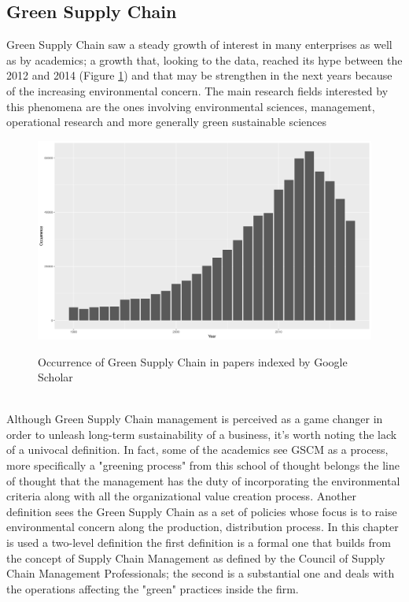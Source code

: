 \begin{doublespace}
\pagebreak

\section{Green Supply Chain}
Green Supply Chain saw a steady growth of interest in many enterprises\cite{Diabat2011} as well as by academics; a growth that, looking to the data\cite{Strobel2018}, reached its hype between the 2012 and 2014 (Figure \ref{fig:occurrence}) and that may be strengthen in the next years because of the increasing environmental concern. The main research fields interested by this phenomena are the ones involving environmental sciences, management, operational research and more generally green sustainable sciences\cite{Shan2018}  
\begin{figure}[ht]
	\includegraphics[width=\textwidth]{Images/occurence.png}	
	\label{fig:occurrence}
	\caption{Occurrence of Green Supply Chain in papers indexed by Google Scholar}	
\end{figure}
\\
Although Green Supply Chain management is perceived as a game changer in order to unleash long-term sustainability of a business, it's worth noting the lack of a univocal definition. In fact, some of the academics see GSCM as a process\cite{Gilbert2001}, more specifically a "greening process" from this school of thought belongs the line of thought that the management has the duty of incorporating the environmental criteria along with all the organizational value creation process. Another definition sees the Green Supply Chain as a set of policies whose focus is to raise environmental concern along the production, distribution process\cite{Zsidisin2001}. In this chapter is used a two-level definition the first definition is a formal one that builds from the concept of Supply Chain Management as defined by the Council of Supply Chain Management Professionals; the second is a substantial one and deals with the operations affecting the "green" practices inside the firm.

\end{doublespace}
